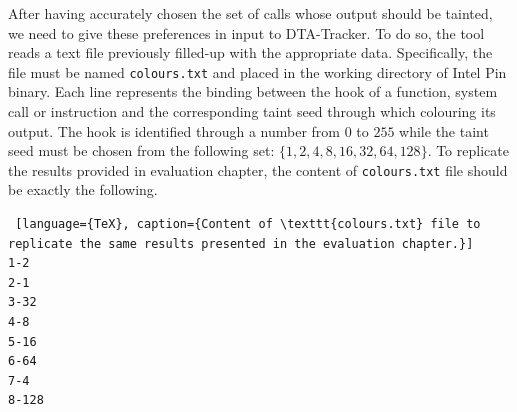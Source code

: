 \documentclass[LaM,binding=0.6cm]{sapthesis}
\begin{document}
After having accurately chosen the set of calls whose output should be tainted, we need to give these preferences in input to DTA-Tracker. To do so, the tool reads a text file previously filled-up with the appropriate data. Specifically, the file must be named \texttt{colours.txt} and placed in the working directory of Intel Pin binary. Each line represents the binding between the hook of a function, system call or instruction and the corresponding taint seed through which colouring its output. The hook is identified through a number from $0$ to $255$ while the taint seed must be chosen from the following set: $\{1, 2, 4, 8, 16, 32, 64, 128\}$. To replicate the results provided in evaluation chapter, the content of \texttt{colours.txt} file should be exactly the following.
\begin{lstlisting} [language={TeX}, caption={Content of \texttt{colours.txt} file to replicate the same results presented in the evaluation chapter.}]
1-2
2-1
3-32
4-8
5-16
6-64
7-4
8-128
\end{lstlisting}
\end{document}
